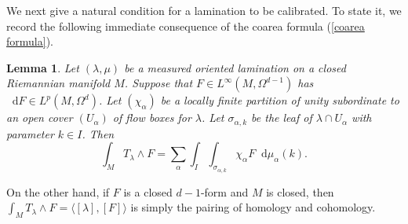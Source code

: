 \documentclass[reqno,11pt]{amsart}
\newcommand*\dif{\mathop{}\!\mathrm{d}}
\newtheorem{lemma}[theorem]{Lemma}
\theoremstyle{definition}
\numberwithin{equation}{section}
\begin{document}
We next give a natural condition for a lamination to be calibrated.
To state it, we record the following immediate consequence of the coarea formula (\ref{coarea formula}).

\begin{lemma}
Let $(\lambda, \mu)$ be a measured oriented lamination on a closed Riemannian manifold $M$.
Suppose that $F \in L^\infty(M, \Omega^{d - 1})$ has $\dif F \in L^p(M, \Omega^d)$.
Let $(\chi_\alpha)$ be a locally finite partition of unity subordinate to an open cover $(U_\alpha)$ of flow boxes for $\lambda$.
Let $\sigma_{\alpha, k}$ be the leaf of $\lambda \cap U_\alpha$ with parameter $k \in I$.
Then
\begin{equation}\label{coarea formula on laminations}
\int_M T_\lambda \wedge F = \sum_\alpha \int_I \int_{\sigma_{\alpha, k}} \chi_\alpha F \dif \mu_\alpha(k).
\end{equation}
\end{lemma}

On the other hand, if $F$ is a closed $d - 1$-form and $M$ is closed, then $\int_M T_\lambda \wedge F = \langle [\lambda], [F]\rangle$ is simply the pairing of homology and cohomology.
\end{document}
